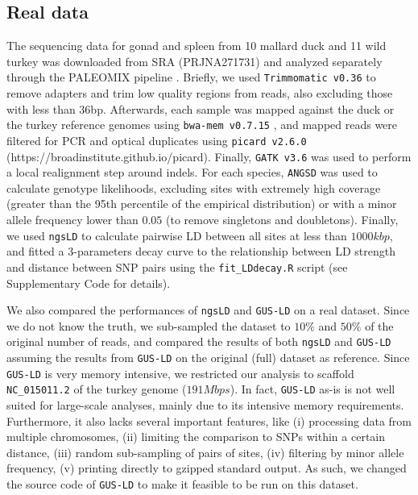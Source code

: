 \documentclass[a4paper]{article}
\begin{document}
\subsection{Real data}
The sequencing data for gonad and spleen from 10 mallard duck and 11 wild turkey was downloaded from SRA (PRJNA271731) and analyzed separately through the PALEOMIX pipeline \citep{Schubert2014}. Briefly, we used \verb|Trimmomatic v0.36| \citep{Bolger2014} to remove adapters and trim low quality regions from reads, also excluding those with less than 36bp. Afterwards, each sample was mapped against the duck \citep{Huang2013} or the turkey \citep{Dalloul2010} reference genomes using \verb|bwa-mem v0.7.15| \citep{Li2013}, and mapped reads were filtered for PCR and optical duplicates using \verb|picard v2.6.0| (https://broadinstitute.github.io/picard). Finally, \verb|GATK v3.6| \citep{Depristo2011} was used to perform a local realignment step around indels. For each species, \verb|ANGSD| was used to calculate genotype likelihoods, excluding sites with extremely high coverage (greater than the 95th percentile of the empirical distribution) or with a minor allele frequency lower than $0.05$ (to remove singletons and doubletons). Finally, we used \verb|ngsLD| to calculate pairwise LD between all sites at less than $1000 kbp$, and fitted a 3-parameters decay curve to the relationship between LD strength and distance between SNP pairs using the \verb|fit_LDdecay.R| script (see Supplementary Code for details).

We also compared the performances of \verb|ngsLD| and \verb|GUS-LD| \citep{Bilton2018} on a real dataset. Since we do not know the truth, we sub-sampled the dataset to $10\%$ and $50\%$ of the original number of reads, and compared the results of both \verb|ngsLD| and \verb|GUS-LD| assuming the results from \verb|GUS-LD| on the original (full) dataset as reference. Since \verb|GUS-LD| is very memory intensive, we restricted our analysis to scaffold \verb|NC_015011.2| of the turkey genome ($191 Mbps$). In fact, \verb|GUS-LD| as-is is not well suited for large-scale analyses, mainly due to its intensive memory requirements. Furthermore, it also lacks several important features, like (i) processing data from multiple chromosomes, (ii) limiting the comparison to SNPs within a certain distance, (iii) random sub-sampling of pairs of sites, (iv) filtering by minor allele frequency, (v) printing directly to gzipped standard output. As such, we changed the source code of \verb|GUS-LD| to make it feasible to be run on this dataset.
 
\end{document}
